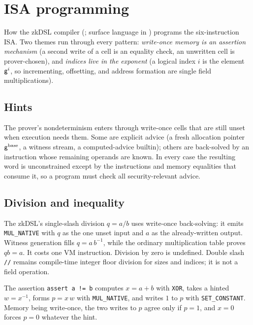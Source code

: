 \section{ISA programming}\label{sec:isa-programming}

How the zkDSL compiler (; surface language in ) programs the six-instruction ISA. Two themes run through every pattern: \emph{write-once memory is an assertion mechanism} (a second write of a cell is an equality check, an unwritten cell is prover-chosen), and \emph{indices live in the exponent} (a logical index $i$ is the element $\mathsf{g}^{i}$, so incrementing, offsetting, and address formation are single field multiplications).

\subsection{Hints}\label{sec:prog-hints}

The prover's nondeterminism enters through write-once cells that are still unset when execution needs them. Some are explicit advice (a fresh allocation pointer $\mathsf{g}^{\mathrm{base}}$, a witness stream, a computed-advice builtin); others are back-solved by an instruction whose remaining operands are known. In every case the resulting word is unconstrained except by the instructions and memory equalities that consume it, so a program must check all security-relevant advice.

\subsection{Division and inequality}\label{sec:prog-div-ne}

The zkDSL's single-slash division $q=a/b$ uses write-once back-solving: it emits \texttt{MUL\_NATIVE} with $q$ as the one unset input and $a$ as the already-written output. Witness generation fills $q=a\,b^{-1}$, while the ordinary multiplication table proves $q b=a$. It costs one VM instruction. Division by zero is undefined. Double slash \texttt{//} remains compile-time integer floor division for sizes and indices; it is not a field operation.

The assertion \texttt{assert a != b} computes $x=a+b$ with \texttt{XOR}, takes a hinted $w=x^{-1}$, forms $p=x\,w$ with \texttt{MUL\_NATIVE}, and writes $1$ to $p$ with \texttt{SET\_CONSTANT}. Memory being write-once, the two writes to $p$ agree only if $p=1$, and $x=0$ forces $p=0$ whatever the hint.

